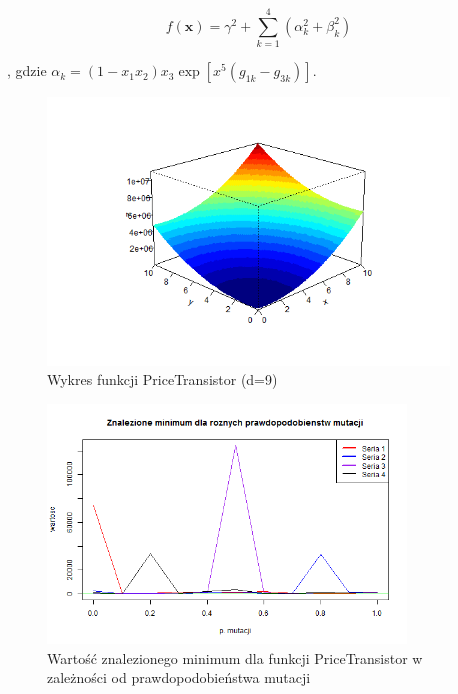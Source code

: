 \documentclass[11pt, a4paper]{article}
\begin{document}
\begin{equation}\label{eq:pricetransistor}
f(\boldsymbol{x}) = \gamma^2 + \sum_{k=1}^{4} ( \alpha_k^2 + \beta_k^2 )
\end{equation}

, gdzie $ \alpha_k = (1-x_1 x_2)x_3 {\exp[ x^5 (g_{1k} - g_{3k})]}$.


\begin{figure}[H]
	\begin{center}
		\includegraphics[width=0.95\textwidth]{./assets/PriceTransistor1.png}
		\caption{Wykres funkcji PriceTransistor (d=9)}
		\label{fig:pricetransistor1}
	\end{center}
\end{figure}

\begin{figure}[H]
	\begin{center}
		\includegraphics[width=0.85\textwidth]{./assets/PriceTransistor2.png}
		\caption{Wartość znalezionego minimum dla funkcji PriceTransistor w zależności od prawdopodobieństwa mutacji}
		\label{fig:pricetransistor2}
	\end{center}
\end{figure}
\end{document}
